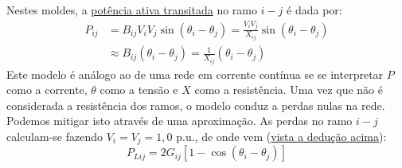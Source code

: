 \noindent Nestes moldes, a \underline{potência ativa transitada} no ramo \( i - j \) é dada por:
$$
    \begin{aligned}
        P_{ij} &= B_{ij} V_i V_j \sin(\theta_i - \theta_j) = \frac{V_i V_j}{X_{ij}} \sin(\theta_i - \theta_j) \\
        &\approx B_{ij} (\theta_i - \theta_j) = \frac{1}{X_{ij}} (\theta_i - \theta_j)
    \end{aligned}
$$
Este modelo é análogo ao de uma rede em corrente contínua se se interpretar \( P \) como a corrente, \( \theta \) como a tensão e \( X \) como a resistência. Uma vez que não é considerada a resistência dos ramos, o modelo conduz a perdas nulas na rede. Podemos mitigar isto através de uma aproximação. As perdas no ramo \( i - j \) calculam-se fazendo \( V_i = V_j = 1,0 \) p.u., de onde vem (\hyperref[subsubsec:potencia-transitada]{vista a dedução acima}):
$$
    P_{Lij} = 2G_{ij} [1 - \cos(\theta_i - \theta_j)]
$$

